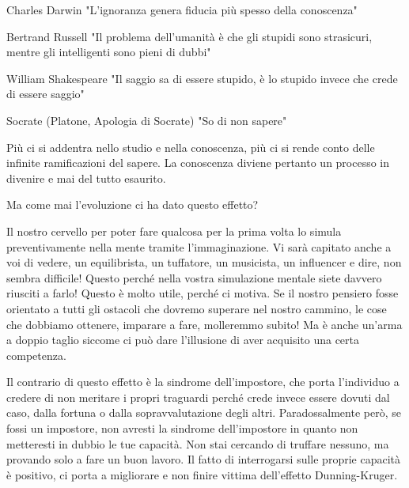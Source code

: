 \documentclass[12pt]{book} %
\begin{document}
Charles Darwin "L'ignoranza genera fiducia più spesso della conoscenza"

Bertrand Russell "Il problema dell'umanità è che gli stupidi sono strasicuri,
mentre gli intelligenti sono pieni di dubbi"

William Shakespeare "Il saggio sa di essere stupido, è lo stupido invece che crede di essere
saggio"

Socrate (Platone, Apologia di Socrate) "So di non sapere"


\bigskip

Più ci si addentra nello studio e nella conoscenza, più ci si rende conto delle infinite ramificazioni del sapere. La
conoscenza diviene pertanto un processo in divenire e mai del tutto esaurito. 


\bigskip

Ma come mai l'evoluzione ci ha dato questo effetto? 

Il nostro cervello per poter fare qualcosa per la prima volta lo simula preventivamente nella mente tramite
l'immaginazione. Vi sarà capitato anche a voi di vedere, un equilibrista, un tuffatore, un
musicista, un influencer e dire, non sembra difficile! Questo perché nella vostra simulazione mentale siete davvero
riusciti a farlo! Questo è molto utile, perché ci motiva. Se il nostro pensiero fosse orientato a tutti gli ostacoli
che dovremo superare nel nostro cammino, le cose che dobbiamo ottenere, imparare a fare, molleremmo subito! Ma è anche
un'arma a doppio taglio siccome ci può dare l'illusione di aver acquisito una
certa competenza.


\bigskip

Il contrario di questo effetto è la sindrome dell'impostore, che porta
l'individuo a credere di non meritare i propri traguardi perché crede invece essere dovuti dal
caso, dalla fortuna o dalla sopravvalutazione degli altri. Paradossalmente però, se fossi un impostore, non avresti la
sindrome dell'impostore in quanto non metteresti in dubbio le tue capacità. Non stai cercando di
truffare nessuno, ma provando solo a fare un buon lavoro. Il fatto di interrogarsi sulle proprie capacità è positivo,
ci porta a migliorare e non finire vittima dell'effetto Dunning-Kruger.


\bigskip
\end{document}
